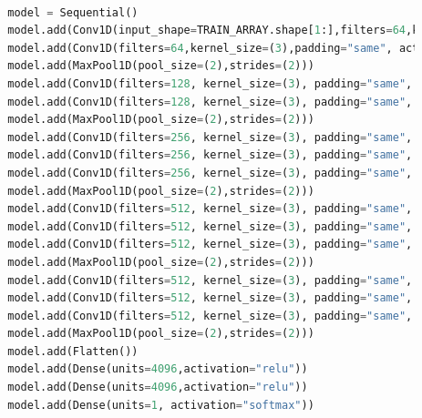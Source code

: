 \documentclass[12pt, a4paper]{article}
\begin{document}
	\vspace{5mm}
	
	\begin{lstlisting}[language=Python]
		
		model = Sequential()
		model.add(Conv1D(input_shape=TRAIN_ARRAY.shape[1:],filters=64,kernel_size=(3),padding="same", activation="relu"))
		model.add(Conv1D(filters=64,kernel_size=(3),padding="same", activation="relu"))
		model.add(MaxPool1D(pool_size=(2),strides=(2)))
		model.add(Conv1D(filters=128, kernel_size=(3), padding="same", activation="relu"))
		model.add(Conv1D(filters=128, kernel_size=(3), padding="same", activation="relu"))
		model.add(MaxPool1D(pool_size=(2),strides=(2)))
		model.add(Conv1D(filters=256, kernel_size=(3), padding="same", activation="relu"))
		model.add(Conv1D(filters=256, kernel_size=(3), padding="same", activation="relu"))
		model.add(Conv1D(filters=256, kernel_size=(3), padding="same", activation="relu"))
		model.add(MaxPool1D(pool_size=(2),strides=(2)))
		model.add(Conv1D(filters=512, kernel_size=(3), padding="same", activation="relu"))
		model.add(Conv1D(filters=512, kernel_size=(3), padding="same", activation="relu"))
		model.add(Conv1D(filters=512, kernel_size=(3), padding="same", activation="relu"))
		model.add(MaxPool1D(pool_size=(2),strides=(2)))
		model.add(Conv1D(filters=512, kernel_size=(3), padding="same", activation="relu"))
		model.add(Conv1D(filters=512, kernel_size=(3), padding="same", activation="relu"))
		model.add(Conv1D(filters=512, kernel_size=(3), padding="same", activation="relu"))
		model.add(MaxPool1D(pool_size=(2),strides=(2)))
		model.add(Flatten())
		model.add(Dense(units=4096,activation="relu"))
		model.add(Dense(units=4096,activation="relu"))
		model.add(Dense(units=1, activation="softmax"))
	\end{lstlisting}
	
\end{document}
